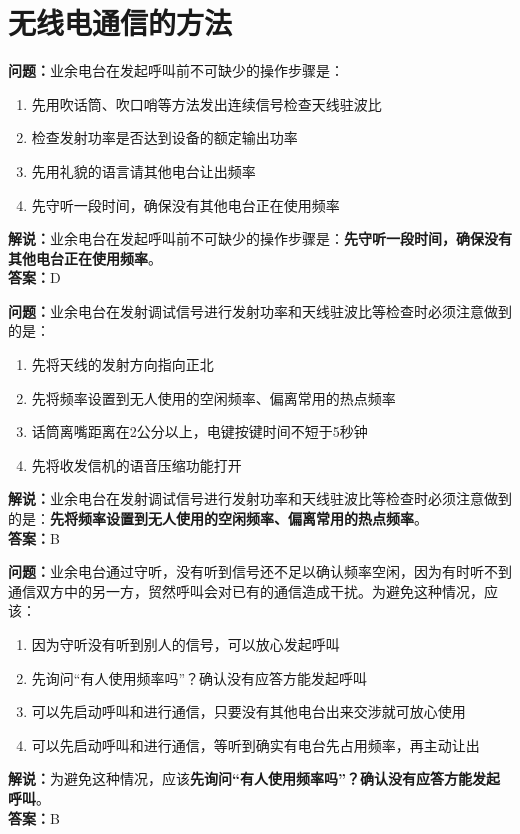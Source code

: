 \chapter{无线电通信的方法}


\textbf{问题：}业余电台在发起呼叫前不可缺少的操作步骤是：
\begin{enumerate}[label=\Alph*), leftmargin=1.5cm]
	\item 先用吹话筒、吹口哨等方法发出连续信号检查天线驻波比
	\item 检查发射功率是否达到设备的额定输出功率
	\item 先用礼貌的语言请其他电台让出频率
	\item 先守听一段时间，确保没有其他电台正在使用频率
\end{enumerate}
\textbf{解说：}业余电台在发起呼叫前不可缺少的操作步骤是：\textbf{先守听一段时间，确保没有其他电台正在使用频率}。\\\textbf{答案：}D%


\textbf{问题：}业余电台在发射调试信号进行发射功率和天线驻波比等检查时必须注意做到的是：
\begin{enumerate}[label=\Alph*), leftmargin=1.5cm]	
	\item 先将天线的发射方向指向正北
	\item 先将频率设置到无人使用的空闲频率、偏离常用的热点频率
	\item 话筒离嘴距离在2公分以上，电键按键时间不短于5秒钟
	\item 先将收发信机的语音压缩功能打开
\end{enumerate}
\textbf{解说：}业余电台在发射调试信号进行发射功率和天线驻波比等检查时必须注意做到的是：\textbf{先将频率设置到无人使用的空闲频率、偏离常用的热点频率}。\\\textbf{答案：}B


\textbf{问题：}业余电台通过守听，没有听到信号还不足以确认频率空闲，因为有时听不到通信双方中的另一方，贸然呼叫会对已有的通信造成干扰。为避免这种情况，应该：
\begin{enumerate}[label=\Alph*), leftmargin=1.5cm]	
	\item 因为守听没有听到别人的信号，可以放心发起呼叫
	\item 先询问“有人使用频率吗”？确认没有应答方能发起呼叫
	\item 可以先启动呼叫和进行通信，只要没有其他电台出来交涉就可放心使用
	\item 可以先启动呼叫和进行通信，等听到确实有电台先占用频率，再主动让出
\end{enumerate}
\textbf{解说：}为避免这种情况，应该\textbf{先询问“有人使用频率吗”？确认没有应答方能发起呼叫}。\\\textbf{答案：}B



